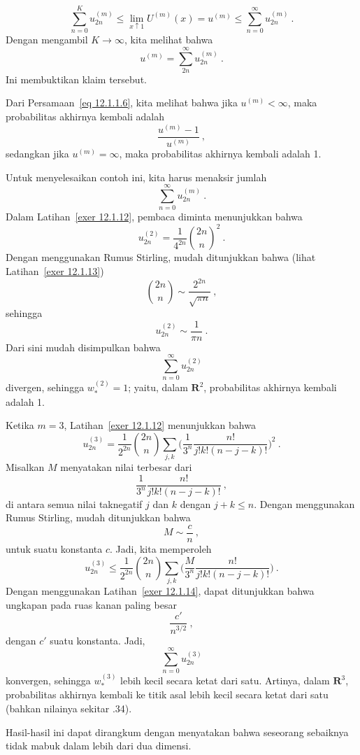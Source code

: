 \begin{example}
$$\sum_{n = 0}^K u^{(m)}_{2n} \le \lim_{x \uparrow 1} U^{(m)}(x) = u^{(m)} \le \sum_{n = 0}^\infty
u^{(m)}_{2n}\ .$$
Dengan mengambil $K \rightarrow \infty$, kita melihat bahwa
$$u^{(m)} = \sum_{2n}^\infty u^{(m)}_{2n}\ .$$
Ini membuktikan klaim tersebut.
\par
Dari Persamaan~\ref{eq 12.1.1.6}, kita melihat bahwa jika $u^{(m)} < \infty$, maka probabilitas
akhirnya kembali adalah
$$\frac {u^{(m)} - 1}{u^{(m)}}\ ,$$
sedangkan jika $u^{(m)} = \infty$, maka probabilitas akhirnya kembali adalah 1.
\par
Untuk menyelesaikan contoh ini, kita harus menaksir jumlah
$$\sum_{n = 0}^\infty u^{(m)}_{2n}\ .$$  
Dalam Latihan~\ref{exer 12.1.12}, pembaca diminta menunjukkan bahwa
$$u^{(2)}_{2n} = \frac 1 {4^{2n}} {{2n}\choose n}^2\ .$$
Dengan menggunakan Rumus Stirling, mudah ditunjukkan bahwa (lihat Latihan~\ref{exer 12.1.13})
$${{2n}\choose n} \sim \frac {2^{2n}}{\sqrt {\pi n}}\ ,$$
sehingga
$$u^{(2)}_{2n} \sim \frac 1{\pi n}\ .$$
Dari sini mudah disimpulkan bahwa
$$\sum_{n = 0}^\infty u^{(2)}_{2n}$$
divergen, sehingga $w^{(2)}_* = 1$; yaitu, dalam ${\mathbf R}^2$, probabilitas akhirnya kembali adalah
1.
\par
Ketika $m = 3$, Latihan~\ref{exer 12.1.12} menunjukkan bahwa
$$u^{(3)}_{2n} = \frac 1{2^{2n}}{{2n}\choose n} \sum_{j,k} 
\biggl(\frac 1{3^n}\frac{n!}{j!k!(n-j-k)!}\biggr)^2\ .$$
Misalkan $M$ menyatakan nilai terbesar dari 
$$\frac 1{3^n}\frac {n!}{j!k!(n - j - k)!}\ ,$$
di antara semua nilai taknegatif $j$ dan $k$ dengan $j + k \le n$.  Dengan menggunakan Rumus
Stirling, mudah ditunjukkan bahwa 
$$M \sim \frac cn\ ,$$
untuk suatu konstanta $c$.  Jadi, kita memperoleh
$$u^{(3)}_{2n} \le \frac 1{2^{2n}}{{2n}\choose n} \sum_{j,k} 
\biggl(\frac M{3^n}\frac{n!}{j!k!(n-j-k)!}\biggr)\ .$$
Dengan menggunakan Latihan~\ref{exer 12.1.14}, dapat ditunjukkan bahwa ungkapan pada ruas kanan paling besar
$$\frac {c'}{n^{3/2}}\ ,$$
dengan $c'$ suatu konstanta.  Jadi,
$$\sum_{n = 0}^\infty u^{(3)}_{2n}$$
konvergen, sehingga $w^{(3)}_*$ lebih kecil secara ketat dari satu.  Artinya, dalam ${\mathbf R}^3$,
probabilitas akhirnya kembali ke titik asal lebih kecil secara ketat dari satu (bahkan nilainya
sekitar .34).
\par
Hasil-hasil ini dapat dirangkum dengan menyatakan bahwa seseorang sebaiknya tidak mabuk dalam lebih dari dua
dimensi.
\end{example}

